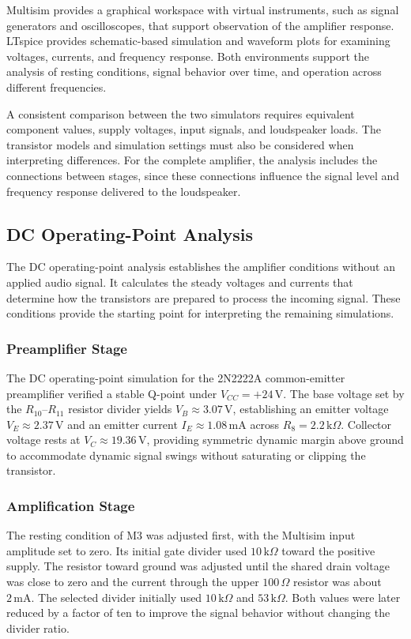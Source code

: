 \documentclass[conference]{IEEEtran}
\begin{document}
Multisim provides a graphical workspace with virtual instruments, such as signal generators and oscilloscopes, that support observation of the amplifier response. LTspice provides schematic-based simulation and waveform plots for examining voltages, currents, and frequency response. Both environments support the analysis of resting conditions, signal behavior over time, and operation across different frequencies.

A consistent comparison between the two simulators requires equivalent component values, supply voltages, input signals, and loudspeaker loads. The transistor models and simulation settings must also be considered when interpreting differences. For the complete amplifier, the analysis includes the connections between stages, since these connections influence the signal level and frequency response delivered to the loudspeaker.

\subsection{DC Operating-Point Analysis}
The DC operating-point analysis establishes the amplifier conditions without an applied audio signal. It calculates the steady voltages and currents that determine how the transistors are prepared to process the incoming signal. These conditions provide the starting point for interpreting the remaining simulations.

\subsubsection{Preamplifier Stage}
The DC operating-point simulation for the 2N2222A common-emitter preamplifier verified a stable Q-point under $V_{CC} = +24\,\mathrm{V}$. The base voltage set by the $R_{10}$--$R_{11}$ resistor divider yields $V_B \approx 3.07\,\mathrm{V}$, establishing an emitter voltage $V_E \approx 2.37\,\mathrm{V}$ and an emitter current $I_E \approx 1.08\,\mathrm{mA}$ across $R_8 = 2.2\,\mathrm{k}\Omega$. Collector voltage rests at $V_C \approx 19.36\,\mathrm{V}$, providing symmetric dynamic margin above ground to accommodate dynamic signal swings without saturating or clipping the transistor.

\subsubsection{Amplification Stage}
The resting condition of M3 was adjusted first, with the Multisim input amplitude set to zero. Its initial gate divider used $10\,\mathrm{k}\Omega$ toward the positive supply. The resistor toward ground was adjusted until the shared drain voltage was close to zero and the current through the upper $100\,\Omega$ resistor was about $2\,\mathrm{mA}$. The selected divider initially used $10\,\mathrm{k}\Omega$ and $53\,\mathrm{k}\Omega$. Both values were later reduced by a factor of ten to improve the signal behavior without changing the divider ratio.
\end{document}
